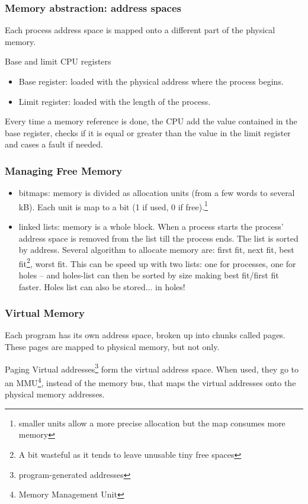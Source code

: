   \begin{frame}
    \frametitle{Memory abstraction: address spaces}
    Each process address space is mapped onto a different part of the physical memory.
    \begin{block}{Base and limit CPU registers}
      \begin{itemize}
        \item Base register: loaded with the physical address where the process begins.
        \item Limit register: loaded with the length of the process.
      \end{itemize}
    \end{block}
    Every time a memory reference is done, the CPU add the value contained in the base register, checks if it is equal or greater than the value in the limit register and cases a fault if needed.
  \end{frame}

  \begin{frame}
    \frametitle{Managing Free Memory}
    \begin{itemize}
      \item bitmaps: memory is divided as allocation units (from a few words to several kB). Each unit is map to a bit (1 if used, 0 if free).\footnote{smaller units allow a more precise allocation but the map consumes more memory}
      \item linked lists: memory is a whole block. When a process starts the process' address space is removed from the list till the process ends. The list is sorted by address. Several algorithm to allocate memory are: first fit, next fit, best fit\footnote{A bit wasteful as it tends to leave unusable tiny free spaces}, worst fit. This can be speed up with two lists: one for processes, one for holes -- and holes-list can then be sorted by size making best fit/first fit faster. Holes list can also be stored... in holes!
    \end{itemize}
  \end{frame}

  \begin{frame}
    \frametitle{Virtual Memory}
    Each program has its own address space, broken up into chunks called pages. These pages are mapped to physical memory, but not only.
    \begin{block}{Paging}
      Virtual addresses\footnote{program-generated addresses} form the virtual address space. When used, they go to an MMU\footnote{Memory Management Unit}, instead of the memory bus, that maps the virtual addresses onto the physical memory addresses.
    \end{block}
  \end{frame}
